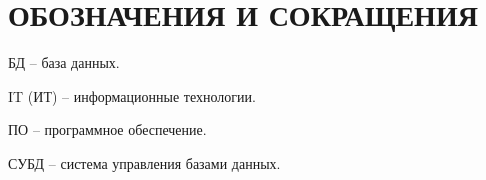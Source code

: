\section*{ОБОЗНАЧЕНИЯ И СОКРАЩЕНИЯ}

БД -- база данных.

IT (ИТ) -- информационные технологии. 

ПО -- программное обеспечение.

СУБД -- система управления базами данных.
